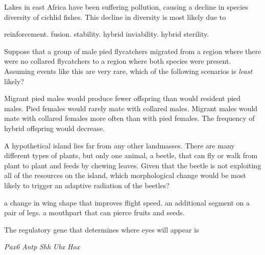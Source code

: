 \question
Lakes in east Africa have been suffering pollution, causing a decline in species diversity of cichlid fishes. This decline in diversity is most likely due to

\begin{choices}
\choice reinforcement. %
\correctchoice fusion. %
\choice stability. %
\choice hybrid inviability. %
\choice hybrid sterility. %
\end{choices}

\question
Suppose that a group of male pied flycatchers migrated from a region where there were no collared flycatchers to a region where both species were present. Assuming events like this are very rare, which of the following scenarios is \emph{least} likely?

\begin{choices}
\choice Migrant pied males would produce fewer offspring than would resident pied males. %
\choice Pied females would rarely mate with collared males. %
\choice Migrant males would mate with collared females more often than with pied females. %
\choice The frequency of hybrid offspring would decrease. %
\end{choices}


\question
A hypothetical island lies far from any other landmasses. There are many different types of plants, but only one animal, a beetle, that can fly or walk from plant to plant and feeds by chewing leaves. Given that the beetle is not exploiting all of the resources on the island, which morphological change would be most likely to trigger an adaptive radiation of the beetles?

\begin{choices}
\choice a change in wing shape that improves flight speed. %
\choice an additional segment on a pair of legs. %
\correctchoice a mouthpart that can pierce fruits and seeds. %
\end{choices}


\question
The regulatory gene that determines where eyes will appear is

\begin{choices}
\correctchoice \textit{Pax6} %
\choice \textit{Antp} %
\choice \textit{Shh} %
\choice \textit{Ubx} %
\choice \textit{Hox} %
\end{choices}

